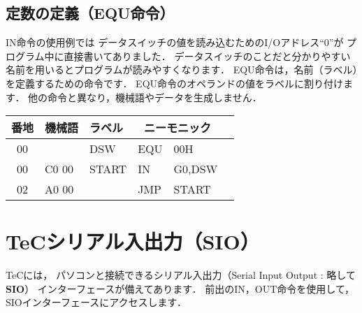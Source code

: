 \begin{framed}
\subsection*{定数の定義（EQU命令）}
{\small IN命令の使用例では
データスイッチの値を読み込むためのI/Oアドレス``0''が
プログラム中に直接書いてありました．
データスイッチのことだと分かりやすい
名前を用いるとプログラムが読みやすくなります．
EQU命令は，名前（ラベル）を定義するための命令です．
EQU命令のオペランドの値をラベルに割り付けます．
他の命令と異なり，機械語やデータを生成しません．

{\tt\small\begin{center}
\begin{tabular}{|c|l|l|l l|l}
\hline
番地 & 機械語 & ラベル & \multicolumn{2}{|c|}{ニーモニック} \\
\hline
00 &       & DSW   & EQU  & 00H     \\
00 & C0 00 & START & IN   & G0,DSW  \\
02 & A0 00 &       & JMP  & START   \\ 
\hline
\end{tabular}
\end{center}}}
\end{framed}


\newpage
\section{TeCシリアル入出力（SIO）}
\label{sio}
TeCには，
パソコンと接続できるシリアル入出力（Serial Input Output : 略して {\bf SIO}）
インターフェースが備えてあります．
前出のIN，OUT命令を使用して，
SIOインターフェースにアクセスします．

